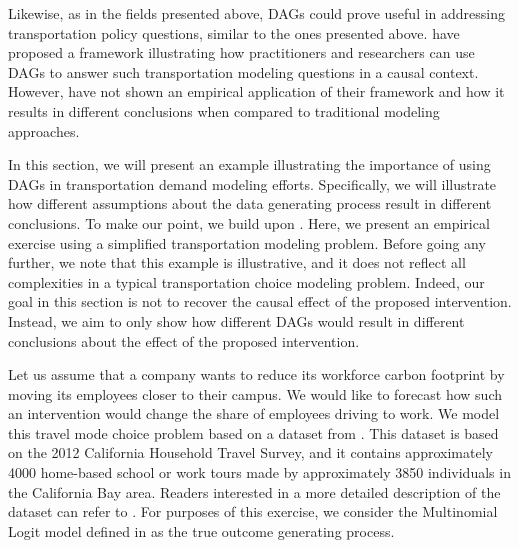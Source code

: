 
Likewise, as in the fields presented above, DAGs could prove useful in addressing transportation policy questions, similar to the ones presented above.
\citet{brathwaite_2018_causal} have proposed a framework illustrating how practitioners and researchers can use DAGs
 to answer such transportation modeling questions in a causal context.
However, \citet{brathwaite_2018_causal} have not shown an empirical application of their framework and how it results
 in different conclusions when compared to traditional modeling approaches.

In this section, we will present an example illustrating the importance of using DAGs in transportation demand modeling efforts. 
Specifically, we will illustrate how different assumptions about the data generating process result in different conclusions.
To make our point, we build upon \citet{brathwaite_2018_causal}.
Here, we present an empirical exercise using a simplified transportation modeling problem.
Before going any further, we note that this example is
illustrative, and it does not reflect all complexities in a typical transportation choice modeling problem.
Indeed, our goal in this section is not to recover the causal effect of the proposed intervention.
Instead, we aim to only show how different DAGs would result in different conclusions about the effect of the proposed intervention.

Let us assume that a company wants to reduce its workforce carbon footprint by moving its employees closer to their campus. 
We would like to forecast how such an intervention would change the share of employees driving to work.
We model this travel mode choice problem based on a dataset from \citet{brathwaite_asymmetric}.
This dataset is based on the 2012 California Household Travel Survey, and it
contains approximately 4000 home-based school or work tours made by approximately 3850 individuals in the California Bay area.
Readers interested in a more detailed description of the dataset can refer to \citet{brathwaite_asymmetric}.
For purposes of this exercise, we consider the Multinomial Logit model defined in \citet{brathwaite_asymmetric} as the true outcome generating process.

